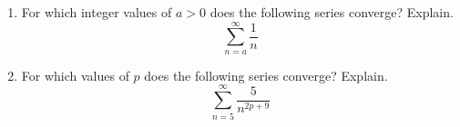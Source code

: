 \documentclass[12pt]{article}
\begin{document}
\begin{enumerate}

\item For which integer values of $a > 0$ does the following series converge?  Explain.
\[
\sum_{n = a}^\infty \frac{1}{n}
\]
\vfill
\item For which values of $p$ does the following series converge?  Explain.
\[
\sum_{n = 5}^\infty \frac{5}{n^{2p + 9}}
\]
\vfill
\end{enumerate}
%
%
%
%
%
%



\end{document}
